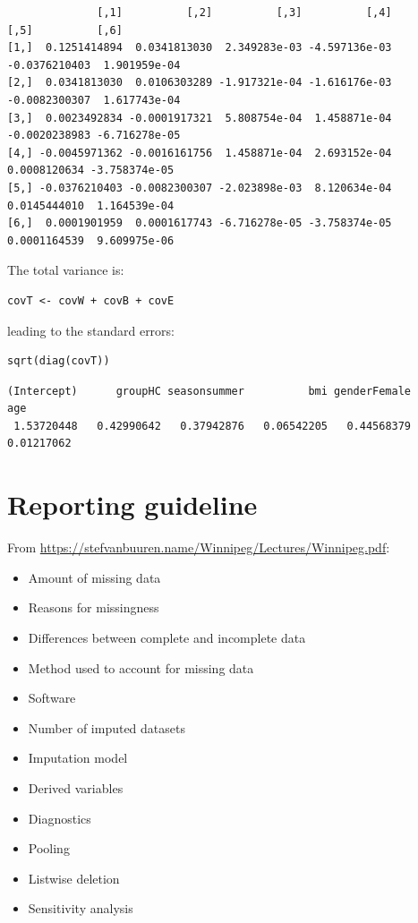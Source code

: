 \documentclass[12pt]{article}
\begin{document}
\begin{verbatim}
              [,1]          [,2]          [,3]          [,4]          [,5]          [,6]
[1,]  0.1251414894  0.0341813030  2.349283e-03 -4.597136e-03 -0.0376210403  1.901959e-04
[2,]  0.0341813030  0.0106303289 -1.917321e-04 -1.616176e-03 -0.0082300307  1.617743e-04
[3,]  0.0023492834 -0.0001917321  5.808754e-04  1.458871e-04 -0.0020238983 -6.716278e-05
[4,] -0.0045971362 -0.0016161756  1.458871e-04  2.693152e-04  0.0008120634 -3.758374e-05
[5,] -0.0376210403 -0.0082300307 -2.023898e-03  8.120634e-04  0.0145444010  1.164539e-04
[6,]  0.0001901959  0.0001617743 -6.716278e-05 -3.758374e-05  0.0001164539  9.609975e-06
\end{verbatim}

The total variance is:
\lstset{language=r,label= ,caption= ,captionpos=b,numbers=none}
\begin{lstlisting}
covT <- covW + covB + covE
\end{lstlisting}

leading to the standard errors:
\lstset{language=r,label= ,caption= ,captionpos=b,numbers=none}
\begin{lstlisting}
sqrt(diag(covT))
\end{lstlisting}
\begin{verbatim}
(Intercept)      groupHC seasonsummer          bmi genderFemale          age 
 1.53720448   0.42990642   0.37942876   0.06542205   0.44568379   0.01217062
\end{verbatim}

\clearpage

\section{Reporting guideline}
\label{sec:orgf206599}
From \url{https://stefvanbuuren.name/Winnipeg/Lectures/Winnipeg.pdf}:
\begin{itemize}
\item Amount of missing data
\item Reasons for missingness
\item Differences between complete and incomplete data
\item Method used to account for missing data
\item Software
\item Number of imputed datasets
\item Imputation model
\item Derived variables
\item Diagnostics
\item Pooling
\item Listwise deletion
\item Sensitivity analysis
\end{itemize}
\end{document}
